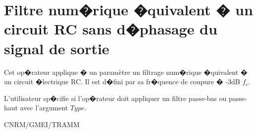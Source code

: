 %
\section{Filtre num�rique �quivalent � un circuit RC sans d�phasage du signal de sortie}

 

Cet op�rateur applique � un param\`etre un filtrage num�rique �quivalent
� un circuit �lectrique RC. Il est d�fini par sa fr�quence de coupure � -3dB $f_c$.

L'utilisateur sp�cifie si l'op�rateur doit appliquer un filtre passe-bas ou 
passe-haut avec l'argument $Type$.

\bigskip





CNRM/GMEI/TRAMM

